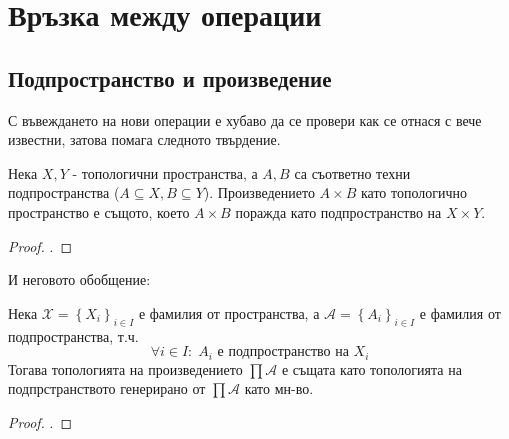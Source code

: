 \section{Връзка между операции}
\subsection{Подпространство и произведение}
С въвеждането на нови операции е хубаво да се провери как се отнася с вече известни, затова помага следното твърдение.
\begin{proposition}
    Нека $X, Y$ - топологични пространства, а $A, B$ са съответно техни подпространства ($A \subseteq X, B \subseteq Y$). Произведението $A \times B$ като топологично пространство е същото, което $A \times B$ поражда като подпространство на $X \times Y$.
\end{proposition}
\begin{proof}
    \cite[p.~87]{munkrestopology}.
\end{proof}
И неговото обобщение:
\begin{proposition}
    Нека $\mathcal X = \left\{X_i\right\}_{i\in I}$ е фамилия от пространства, а $\mathcal A = \left\{A_i\right\}_{i\in I}$ е фамилия от подпространства, т.ч.
    \begin{equation}
        \forall i \in I:\; A_i \text{ е подпространство на } X_i
    \end{equation}
    Тогава топологията на произведението $\prod \mathcal A$ е същата като топологията на подпрстранството генерирано от $\prod \mathcal A$ като мн-во.
\end{proposition}
\begin{proof}
    \cite[p.~78]{engelking1989general}.
\end{proof}

